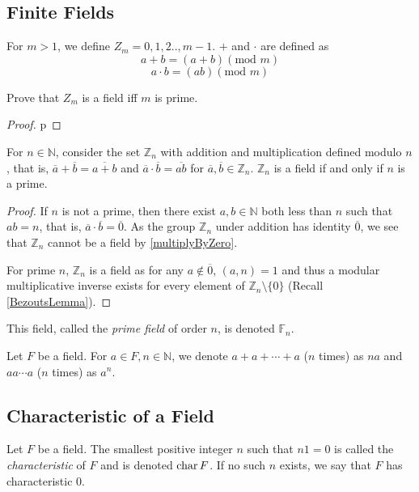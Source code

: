\subsection{Finite Fields}
\begin{definition}
    For $m>1$, we define $Z_{m}={0,1,2..,m-1}$. $+$ and $\cdot$ are defined as 
    $$a+b=(a+b)(\textrm{mod } m)$$ $$a\cdot b=(ab)(\textrm{mod } m)$$ 
\end{definition}

\begin{exercise}
    Prove that $Z_{m}$ is a field iff $m$ is prime.
\end{exercise}
\begin{proof}
    p
\end{proof}

\begin{theorem}
    For $n\in\mathbb{N}$, consider the set $\mathbb{Z}_n$ with addition and multiplication defined modulo $n$, that is, $\overline{a}+\overline{b}=\overline{a+b}$ and $\overline{a}\cdot\overline{b}=\overline{ab}$ for $\overline{a}, \overline{b}\in\mathbb{Z}_n$. $\mathbb{Z}_n$ is a field if and only if $n$ is a prime.
\end{theorem}
\begin{proof}
If $n$ is not a prime, then there exist $a,b\in\mathbb{N}$ both less than $n$ such that $ab=n$, that is, $\overline{a}\cdot\overline{b}=\overline{0}$. As the group $\mathbb{Z}_n$ under addition has identity $\overline{0}$, we see that $\mathbb{Z}_n$ cannot be a field by \ref{multiplyByZero}.

For prime $n$, $\mathbb{Z}_n$ is a field as for any $a\not\in \overline{0}$, $(a,n)=1$ and thus a modular multiplicative inverse exists for every element of $\mathbb{Z}_n\setminus\{0\}$ (Recall \ref{BezoutsLemma}).
\end{proof}

This field, called the \textit{prime field} of order $n$, is denoted $\mathbb{F}_n$.

\vspace{2mm}
Let $F$ be a field. For $a\in F, n\in\mathbb{N}$, we denote $a+a+\cdots+a$ ($n$ times) as $na$ and $aa\cdots a$ ($n$ times) as $a^n$.

\subsection{Characteristic of a Field}

\begin{definition}
    Let $F$ be a field. The smallest positive integer $n$ such that $n1=0$ is called the \textit{characteristic} of $F$ and is denoted $\operatorname{char} F$. If no such $n$ exists, we say that $F$ has characteristic $0$.
\end{definition}

